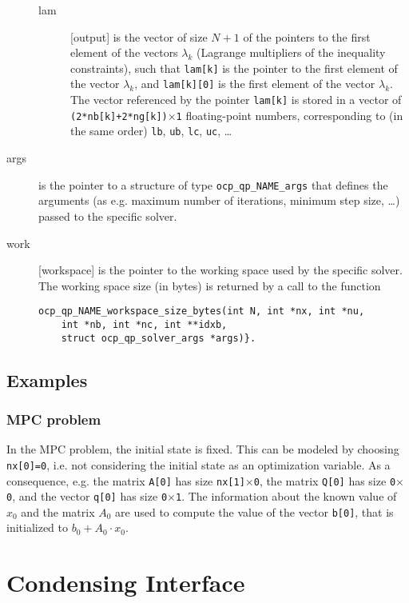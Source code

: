 \documentclass{report}
\begin{document}
\begin{description}
\begin{description}
		\item[lam] [output] is the vector of size $N+1$ of the pointers to the first element of the vectors $\lambda_k$ (Lagrange multipliers of the inequality constraints), such that \texttt{lam[k]} is the pointer to the first element of the vector $\lambda_k$, and \texttt{lam[k][0]} is the first element of the vector $\lambda_k$.
		The vector referenced by the pointer \texttt{lam[k]} is stored in a vector of \texttt{(2*nb[k]+2*ng[k])$\times$1} floating-point numbers, corresponding to (in the same order) \texttt{lb}, \texttt{ub}, \texttt{lc}, \texttt{uc}, \ldots
	\end{description}
	\item[args] is the pointer to a structure of type \texttt{ocp\_qp\_NAME\_args} that defines the arguments (as e.g. maximum number of iterations, minimum step size, \ldots) passed to the specific solver.
	\item[work] [workspace] is the pointer to the working space used by the specific solver.
The working space size (in bytes) is returned by a call to the function 
\begin{verbatim}
ocp_qp_NAME_workspace_size_bytes(int N, int *nx, int *nu, 
    int *nb, int *nc, int **idxb, 
    struct ocp_qp_solver_args *args)}. 
\end{verbatim}
\end{description}

\subsection{Examples}

\subsubsection{MPC problem}

In the MPC problem, the initial state is fixed.
This can be modeled by choosing \texttt{nx[0]=0}, i.e. not considering the initial state as an optimization variable.
As a consequence, e.g. the matrix \texttt{A[0]} has size \texttt{nx[1]$\times$0}, the matrix \texttt{Q[0]} has size \texttt{0$\times$0}, and the vector \texttt{q[0]} has size \texttt{0$\times$1}.
The information about the known value of $x_0$ and the matrix $A_0$ are used to compute the value of the vector \texttt{b[0]}, that is initialized to $b_0 + A_0 \cdot x_0$.

\section{Condensing Interface}
\end{document}
